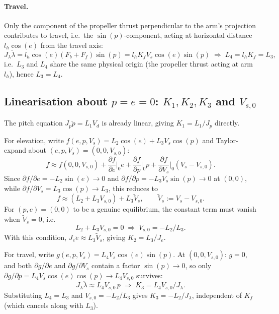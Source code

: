 \paragraph{Travel.} Only the component of the propeller thrust perpendicular to the arm's projection contributes to travel, i.e.\ the $\sin(p)$-component, acting at horizontal distance $l_h\cos(e)$ from the travel axis:
\begin{equation}
	J_\lambda\ddot\lambda = l_h\cos(e)(F_b+F_f)\sin(p) = l_hK_fV_s\cos(e)\sin(p) \;\Rightarrow\; L_4=l_hK_f=L_3,
\end{equation}
i.e.\ $L_3$ and $L_4$ share the same physical origin (the propeller thrust acting at arm $l_h$), hence $L_3=L_4$.

\subsection{Linearisation about $p=e=0$: $K_1,K_2,K_3$ and $V_{s,0}$}\label{app:K_derivation}
The pitch equation $J_p\ddot p=L_1V_d$ is already linear, giving $K_1=L_1/J_p$ directly.

For elevation, write $f(e,p,V_s)=L_2\cos(e)+L_3V_s\cos(p)$ and Taylor-expand about $(e,p,V_s)=(0,0,V_{s,0})$:
\begin{equation}
	f \approx f(0,0,V_{s,0}) + \frac{\partial f}{\partial e}\bigg|_0 e + \frac{\partial f}{\partial p}\bigg|_0 p + \frac{\partial f}{\partial V_s}\bigg|_0(V_s-V_{s,0}).
\end{equation}
Since $\partial f/\partial e=-L_2\sin(e)\to0$ and $\partial f/\partial p=-L_3V_s\sin(p)\to0$ at $(0,0)$, while $\partial f/\partial V_s=L_3\cos(p)\to L_3$, this reduces to
\begin{equation}
	f \approx (L_2+L_3V_{s,0}) + L_3\tilde V_s, \qquad \tilde V_s := V_s - V_{s,0}.
\end{equation}
For $(p,e)=(0,0)$ to be a genuine equilibrium, the constant term must vanish when $\tilde V_s=0$, i.e.
\begin{equation}
	L_2 + L_3V_{s,0} = 0 \;\Rightarrow\; V_{s,0} = -L_2/L_3.
\end{equation}
With this condition, $J_e\ddot e \approx L_3\tilde V_s$, giving $K_2=L_3/J_e$.

For travel, write $g(e,p,V_s)=L_4V_s\cos(e)\sin(p)$. At $(0,0,V_{s,0})$: $g=0$, and both $\partial g/\partial e$ and $\partial g/\partial V_s$ contain a factor $\sin(p)\to0$, so only $\partial g/\partial p=L_4V_s\cos(e)\cos(p)\to L_4V_{s,0}$ survives:
\begin{equation}
	J_\lambda\ddot\lambda \approx L_4V_{s,0}\,p \;\Rightarrow\; K_3 = L_4V_{s,0}/J_\lambda.
\end{equation}
Substituting $L_4=L_3$ and $V_{s,0}=-L_2/L_3$ gives $K_3=-L_2/J_\lambda$, independent of $K_f$ (which cancels along with $L_3$).

